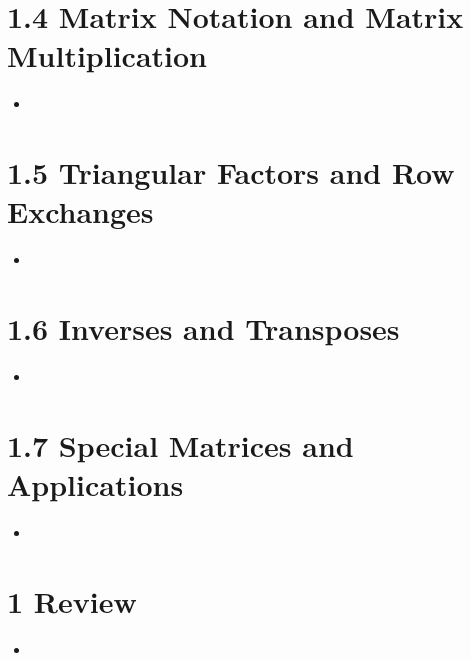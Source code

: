 \section{1.4 Matrix Notation and Matrix Multiplication}
\begin{itemize}
  \item []

\end{itemize}

\section{1.5 Triangular Factors and Row Exchanges}
\begin{itemize}
  \item []

\end{itemize}

\section{1.6 Inverses and Transposes}
\begin{itemize}
  \item []

\end{itemize}

\section{1.7 Special Matrices and Applications}
\begin{itemize}
  \item []


\end{itemize}

\section{1 Review}
\begin{itemize}
  \item []


\end{itemize}


